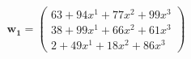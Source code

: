 \documentclass[preview]{standalone}
\begin{document}
\begin{align*}
\mathbf{w_1} = \begin{pmatrix}63 + 94x^{1} + 77x^{2} + 99x^{3} \\ 38 + 99x^{1} + 66x^{2} + 61x^{3} \\ 2 + 49x^{1} + 18x^{2} + 86x^{3}\end{pmatrix}
\end{align*}
\end{document}
